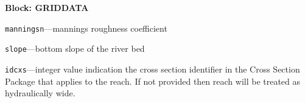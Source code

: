 \item \textbf{Block: GRIDDATA}

\begin{description}
\item \texttt{manningsn}---mannings roughness coefficient

\item \texttt{slope}---bottom slope of the river bed

\item \texttt{idcxs}---integer value indication the cross section identifier in the Cross Section Package that applies to the reach.  If not provided then reach will be treated as hydraulically wide.

\end{description}


